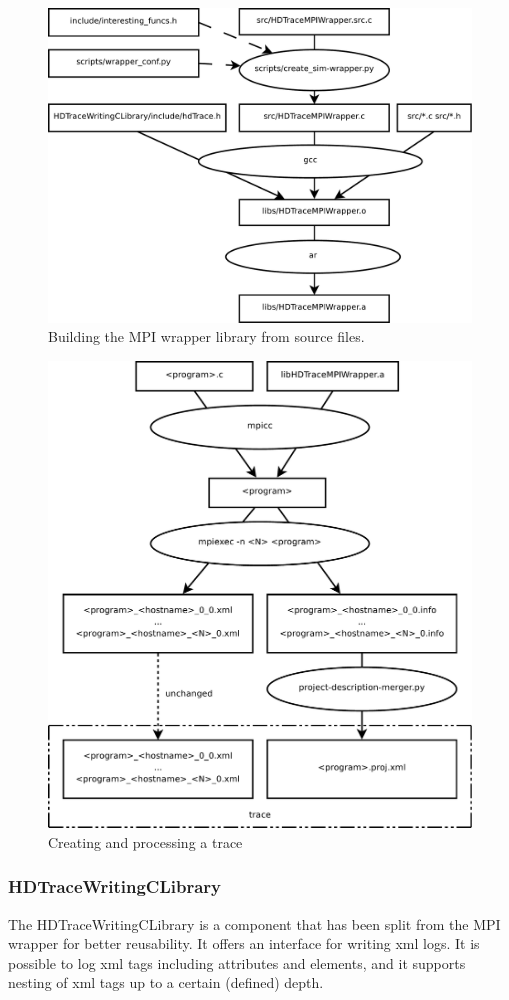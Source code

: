 \documentclass[a4paper,12pt,pdftex]{scrartcl}
\begin{document}
\begin{figure}[t]
  \centering
  \includegraphics[width = 0.8 \textwidth]{img/building}
  \caption{Building the MPI wrapper library from source files.}
  \label{fig:building}
\end{figure}

\begin{figure}[h]
  \centering
  \includegraphics[width=0.6 \textwidth]{img/trace}
  \caption{Creating and processing a trace}
\end{figure}

\subsubsection{HDTraceWritingCLibrary}
The HDTraceWritingCLibrary is a component that has been split from the
MPI wrapper for better reusability. It offers an interface for writing
xml logs. It is possible to log xml tags including attributes and
elements, and it supports nesting of xml tags up to a certain
(defined) depth.
\end{document}

